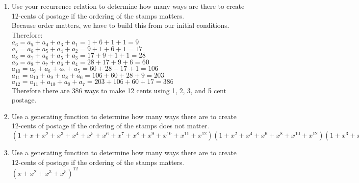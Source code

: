 \documentclass[12pt, letterpaper]{article}
\begin{document}
\begin{flushleft}
\begin{enumerate}
\begin{enumerate}
    \item Use your recurrence relation to determine how many ways are there to create 12-cents of postage if the ordering of the stamps matters. \\
      \smallskip
      Because order matters, we have to build this from our initial conditions. Therefore: \\
      $a_6 = a_5 + a_4 + a_3 + a_1 = 1 + 6 + 1 + 1 = 9$ \\
      $a_7 = a_6 + a_5 + a_4 + a_2 = 9 + 1 + 6 + 1 = 17$ \\
      $a_8 = a_7 + a_6 + a_5 + a_3 = 17 + 9 + 1 + 1 = 28$ \\
      $a_9 = a_8 + a_7 + a_6 + a_4 = 28 + 17 + 9 + 6 = 60$ \\
      $a_{10} = a_9 + a_8 + a_7 + a_5 = 60 + 28 + 17 + 1 = 106$ \\
      $a_{11} = a_{10} + a_9 + a_8 + a_6 = 106 + 60 + 28 + 9 = 203$ \\
      $a_{12} = a_{11} + a_{10} + a_9 + a_7 = 203 + 106 + 60 + 17 = 386$ \\
      Therefore there are 386 ways to make 12 cents using 1, 2, 3, and 5 cent postage. \\
    \item Use a generating function to determine how many ways there are to create 12-cents of postage if the ordering of the stamps does not matter. \\
      \smallskip
      $(1+x+x^2+x^3+x^4+x^5+x^6+x^7+x^8+x^9+x^{10}+x^{11}+x^{12})(1+x^2+x^4+x^6+x^8+x^{10}+x^{12})(1+x^3+x^6+x^9+x^{12})(1+x^5+x^{10})$ \\
    \item Use a generating function to determine how many ways there are to create 12-cents of postage if the ordering of the stamps matters. \\
      \smallskip
      $(x+x^2+x^3+x^5)^{12}$\\
      
    \end{enumerate}


\end{enumerate}
\end{flushleft}
\end{document}
